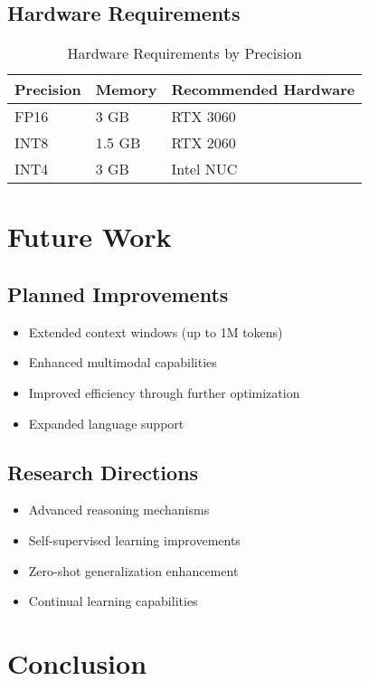 \documentclass[11pt,a4paper]{article}
\begin{document}
\subsection{Hardware Requirements}
\begin{table}[H]
\centering
\begin{tabular}{lll}
\toprule
\textbf{Precision} & \textbf{Memory} & \textbf{Recommended Hardware} \\
\midrule
FP16 & 3 GB & RTX 3060 \\
INT8 & 1.5 GB & RTX 2060 \\
INT4 & 3 GB & Intel NUC \\
\bottomrule
\end{tabular}
\caption{Hardware Requirements by Precision}
\end{table}

\section{Future Work}

\subsection{Planned Improvements}
\begin{itemize}
    \item Extended context windows (up to 1M tokens)
    \item Enhanced multimodal capabilities
    \item Improved efficiency through further optimization
    \item Expanded language support
\end{itemize}

\subsection{Research Directions}
\begin{itemize}
    \item Advanced reasoning mechanisms
    \item Self-supervised learning improvements
    \item Zero-shot generalization enhancement
    \item Continual learning capabilities
\end{itemize}

\section{Conclusion}
\end{document}
